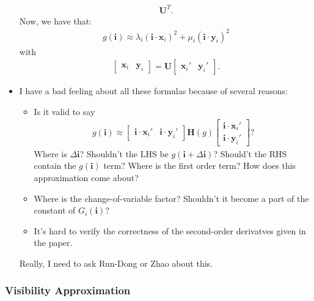 \documentclass[10pt]{article}
\newcommand{\ve}[1]{\mathbf{#1}}
\begin{document}
\begin{itemize}
\begin{align*}
      \ve{U}^T.
    \end{align*}
    Now, we have that:
    \begin{align*}
      g(\ve{i}) \approx \lambda_i (\ve{i} \cdot \ve{x}_i)^2 + \mu_i (\ve{i} \cdot \ve{y}_i)^2 
    \end{align*}
    with
    \begin{align*}
      \begin{bmatrix}
        \ve{x}_i & \ve{y}_i
      \end{bmatrix}
      = \ve{U} \begin{bmatrix}
        \ve{x}_i' & \ve{y}_i'
      \end{bmatrix}.
    \end{align*}

    \item I have a bad feeling about all these formulas because of several reasons:
    \begin{itemize}
      \item Is it valid to say
      \begin{align*}
        g(\ve{i}) \approx
        \begin{bmatrix}
          \ve{i} \cdot \ve{x}_i' &
          \ve{i} \cdot \ve{y}_i'
        \end{bmatrix}
        \ve{H}(g)
        \begin{bmatrix}
          \ve{i} \cdot \ve{x}_i' \\
          \ve{i} \cdot \ve{y}_i'
        \end{bmatrix}?
      \end{align*}
      Where is $\Delta \ve{i}$?  Shouldn't the LHS be $g(\ve{i} + \Delta\ve{i})$?  Should't the RHS contain the $g(\ve{i})$ term?  Where is the first order term?  How does this approximation come about?

      \item Where is the change-of-variable factor?  Shouldn't it become a part of the constant of $G_i(\ve{i})$?

      \item It's hard to verify the correctness of the second-order derivatves given in the paper.
    \end{itemize}
    Really, I need to ask Run-Dong or Zhao about this.
  \end{itemize}  

  \subsubsection{Visibility Approximation}
\end{document}
